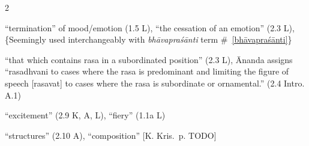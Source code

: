 \documentclass[10pt]{article}
\begin{document}
\begin{multicols}{2}
\begin{enumerate}[
			leftmargin=0em,
			rightmargin=0em,
		]
		 ``termination'' of mood/emotion (1.5 L),
		``the cessation of an emotion'' (2.3 L),
		\{Seemingly used interchangeably with \textit{bhāvapraśānti} term \#~\ref{bhāvapraśānti}\}

		 ``that which contains rasa in a subordinated position'' (2.3 L),
		Ānanda  assigns ``rasadhvani to cases where the rasa is predominant and limiting the figure of speech [rasavat] to cases where the rasa is subordinate or ornamental.''
		(2.4 Intro. A.1) %




		 ``excitement'' (2.9 K, A, L), ``fiery'' (1.1a L)

		 ``structures'' (2.10 A), %
		``composition'' [K. Kris.\ p. TODO] %




\end{enumerate}
\end{multicols}
\end{document}
